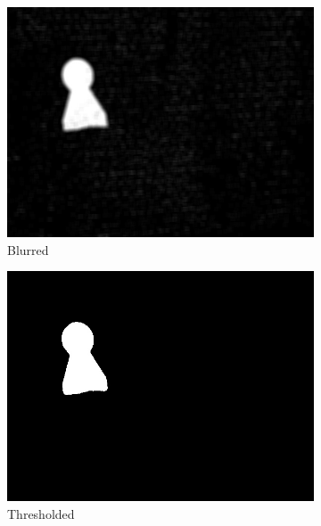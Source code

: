 \begin{figure}
\begin{subfigure}[b]{0.48\linewidth}
    \includegraphics[width=\linewidth]{img/simple_background/blurring.jpg}
    \caption{Blurred}
  \end{subfigure}
  \begin{subfigure}[b]{0.48\linewidth}
    \includegraphics[width=\linewidth]{img/simple_background/second-thresh.jpg}
    \caption{Thresholded}
  \end{subfigure}
  \begin{subfigure}[b]{0.48\linewidth}

\end{subfigure}
\end{figure}
